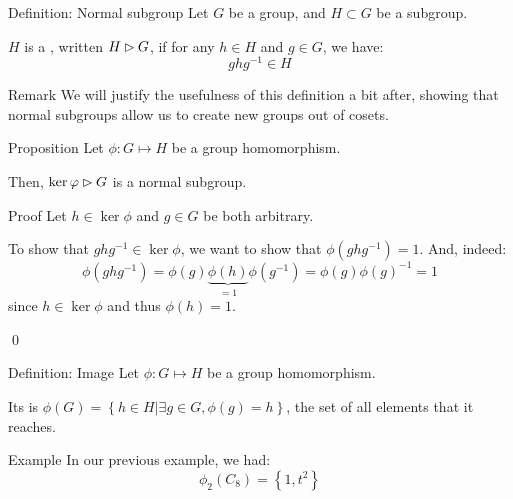 \documentclass[a4paper]{article}
\begin{document}
\begin{parag}{Definition: Normal subgroup}
    Let $G$ be a group, and $H \subset G$ be a subgroup.

    $H$ is a , written $H \rhd G$, if for any $h \in H$ and $g \in G$, we have:
    \[g h g^{-1} \in H\]

    \begin{subparag}{Remark}
        We will justify the usefulness of this definition a bit after, showing that normal subgroups allow us to create new groups out of cosets.
    \end{subparag}
\end{parag}

\begin{parag}{Proposition}
    Let $\phi: G \mapsto H$ be a group homomorphism.

    Then, $\ker \varphi \rhd G$ is a normal subgroup.

    \begin{subparag}{Proof}
        Let $h \in \ker \phi$ and $g \in G$ be both arbitrary.

        To show that $g h g^{-1} \in \ker \phi$, we want to show that $\phi\left(g h g^{-1}\right) = 1$. And, indeed:
        \[\phi\left(g h g^{-1}\right) = \phi\left(g\right)\underbrace{\phi\left(h\right)}_{= 1}\phi\left(g^{-1}\right) = \phi\left(g\right)\phi\left(g\right)^{-1} = 1\]
        since $h \in \ker \phi$ and thus $\phi\left(h\right) = 1$.

        \qed
    \end{subparag}
\end{parag}

\begin{parag}{Definition: Image}
    Let $\phi: G \mapsto H$ be a group homomorphism.

    Its  is $\phi\left(G\right) = \left\{h \in H | \exists g \in G, \phi\left(g\right) = h\right\}$, the set of all elements that it reaches.

    \begin{subparag}{Example}
        In our previous example, we had: 
        \[\phi_2\left(C_8\right) = \left\{1, t^2\right\}\]
        
    \end{subparag}
    
\end{parag}
\end{document}
